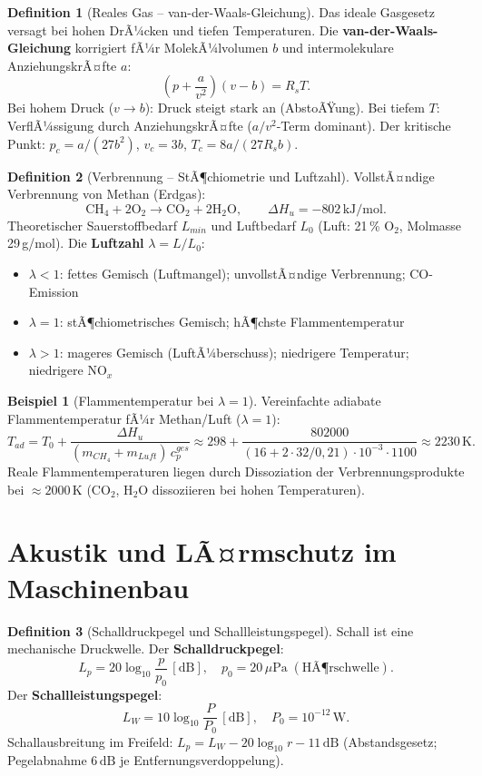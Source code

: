 ﻿\documentclass[a4paper,12pt]{report}
\theoremstyle{definition}
\newtheorem{definition}{Definition}
\newtheorem{beispiel}{Beispiel}
\begin{document}
\begin{definition}[Reales Gas -- van-der-Waals-Gleichung]
Das ideale Gasgesetz versagt bei hohen DrÃ¼cken und tiefen Temperaturen.
Die \textbf{van-der-Waals-Gleichung} korrigiert fÃ¼r MolekÃ¼lvolumen $b$
und intermolekulare AnziehungskrÃ¤fte $a$:
\[
  \left(p + \frac{a}{v^2}\right)(v - b) = R_s T.
\]
Bei hohem Druck ($v \to b$): Druck steigt stark an (AbstoÃŸung).
Bei tiefem $T$: VerflÃ¼ssigung durch AnziehungskrÃ¤fte ($a/v^2$-Term dominant).
Der kritische Punkt: $p_c = a/(27b^2)$, $v_c = 3b$, $T_c = 8a/(27R_s b)$.
\end{definition}

\begin{definition}[Verbrennung -- StÃ¶chiometrie und Luftzahl]
VollstÃ¤ndige Verbrennung von Methan (Erdgas):
\[
  \mathrm{CH_4 + 2O_2 \to CO_2 + 2H_2O}, \qquad
  \Delta H_u = -802\,\mathrm{kJ/mol}.
\]
Theoretischer Sauerstoffbedarf $L_{min}$ und Luftbedarf $L_{0}$
(Luft: 21\,\% O$_2$, Molmasse 29\,g/mol).
Die \textbf{Luftzahl} $\lambda = L/L_{0}$:
\begin{itemize}
    \item[-] $\lambda < 1$: fettes Gemisch (Luftmangel); unvollstÃ¤ndige Verbrennung; CO-Emission
    \item[-] $\lambda = 1$: stÃ¶chiometrisches Gemisch; hÃ¶chste Flammentemperatur
    \item[-] $\lambda > 1$: mageres Gemisch (LuftÃ¼berschuss); niedrigere Temperatur; niedrigere NO$_x$
\end{itemize}
\end{definition}

\begin{beispiel}[Flammentemperatur bei $\lambda = 1$]
Vereinfachte adiabate Flammentemperatur fÃ¼r Methan/Luft ($\lambda = 1$):
\[
  T_{ad} = T_0 + \frac{\Delta H_u}{(m_{CH_4} + m_{Luft})\,c_p^{ges}}
  \approx 298 + \frac{802000}{(16 + 2\cdot32/0{,}21)\cdot10^{-3}\cdot1100}
  \approx 2230\,\mathrm{K}.
\]
Reale Flammentemperaturen liegen durch Dissoziation der Verbrennungsprodukte
bei $\approx 2000\,\mathrm{K}$ (CO$_2$, H$_2$O dissoziieren bei hohen Temperaturen).
\end{beispiel}

\section{Akustik und LÃ¤rmschutz im Maschinenbau}

\begin{definition}[Schalldruckpegel und Schallleistungspegel]
Schall ist eine mechanische Druckwelle. Der \textbf{Schalldruckpegel}:
\[
  L_p = 20\log_{10}\frac{p}{p_0}\,[\mathrm{dB}], \quad p_0 = 20\,\mu\mathrm{Pa}
  \;(\text{HÃ¶rschwelle}).
\]
Der \textbf{Schallleistungspegel}:
\[
  L_W = 10\log_{10}\frac{P}{P_0}\,[\mathrm{dB}], \quad P_0 = 10^{-12}\,\mathrm{W}.
\]
Schallausbreitung im Freifeld: $L_p = L_W - 20\log_{10}r - 11\,\mathrm{dB}$
(Abstandsgesetz; Pegelabnahme $6\,\mathrm{dB}$ je Entfernungsverdoppelung).
\end{definition}
\end{document}
